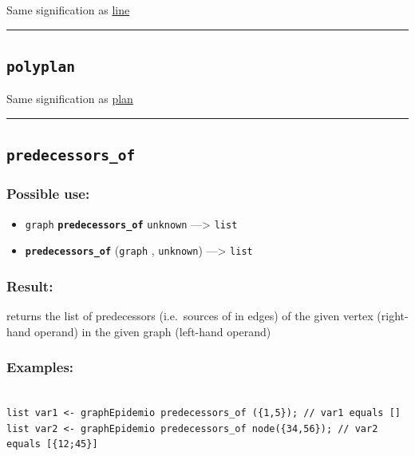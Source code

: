 \documentclass[]{book}
\providecommand{\tightlist}{%
  \setlength{\itemsep}{0pt}\setlength{\parskip}{0pt}}
\theoremstyle{definition}
\theoremstyle{definition}
\theoremstyle{definition}
\theoremstyle{remark}
\begin{document}
Same signification as \href{operators-i-to-m.html\#line}{line}

\begin{center}\rule{0.5\linewidth}{\linethickness}\end{center}

\subsection{\texorpdfstring{\texttt{polyplan}}{polyplan}}\label{polyplan}

Same signification as \href{operators-n-to-r.html\#plan}{plan}

\begin{center}\rule{0.5\linewidth}{\linethickness}\end{center}

\subsection{\texorpdfstring{\texttt{predecessors\_of}}{predecessors\_of}}\label{predecessors_of}

\subsubsection{Possible use:}\label{possible-use-415}

\begin{itemize}
\tightlist
\item
  \texttt{graph} \textbf{\texttt{predecessors\_of}} \texttt{unknown}
  ---\textgreater{} \texttt{list}
\item
  \textbf{\texttt{predecessors\_of}} (\texttt{graph} , \texttt{unknown})
  ---\textgreater{} \texttt{list}
\end{itemize}

\subsubsection{Result:}\label{result-401}

returns the list of predecessors (i.e.~sources of in edges) of the given
vertex (right-hand operand) in the given graph (left-hand operand)

\subsubsection{Examples:}\label{examples-289}

\begin{verbatim}
 
list var1 <- graphEpidemio predecessors_of ({1,5}); // var1 equals [] 
list var2 <- graphEpidemio predecessors_of node({34,56}); // var2 equals [{12;45}]
\end{verbatim}
\end{document}
